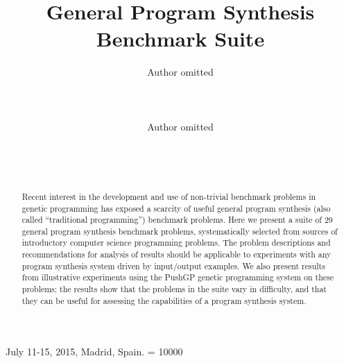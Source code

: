 \documentclass{sig-alternate}
\begin{document}
%
 {July 11-15, 2015, Madrid, Spain.}
\widowpenalty = 10000

\title{General Program Synthesis Benchmark Suite}


\author{
\alignauthor
Author omitted\\
       \\
       \\
       \\
\alignauthor
Author omitted\\
       \\
       \\
       \\
}

\maketitle

\begin{abstract}
Recent interest in the development and use of non-trivial benchmark problems in genetic programming has exposed a scarcity of useful general program synthesis (also called ``traditional programming'') benchmark problems. 
Here we present a suite of $29$ general program synthesis benchmark problems, systematically selected from sources of introductory computer science programming problems. 
The problem descriptions and recommendations for analysis of results should be applicable to experiments with any program synthesis system driven by input/output examples. 
We also present results from illustrative experiments using the PushGP genetic programming system on these problems; the results show that the problems in the  suite vary in difficulty, and that they can be useful for assessing the capabilities of a program synthesis system.
\end{abstract}
\end{document}
